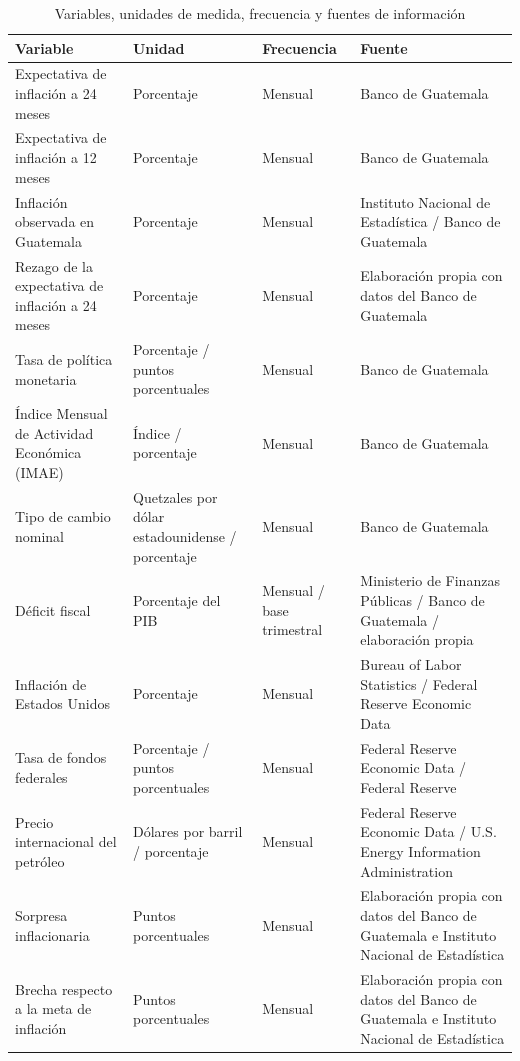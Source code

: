 \documentclass[
  10.5pt,
  letterpaper,
  twocolumn]{article}
\begin{document}
\clearpage
\onecolumn
\begin{landscape}
\thispagestyle{empty}

\begin{table}
\centering
\caption{\label{tab:unnamed-chunk-1}Variables, unidades de medida, frecuencia y fuentes de información}
\centering
\fontsize{9}{11}\selectfont
\begin{threeparttable}
\begin{tabular}[t]{>{\raggedright\arraybackslash}p{7.5cm}>{\raggedright\arraybackslash}p{4.5cm}>{\raggedright\arraybackslash}p{3.5cm}>{\raggedright\arraybackslash}p{8.5cm}}
\toprule
Variable & Unidad & Frecuencia & Fuente\\
\midrule
Expectativa de inflación a 24 meses & Porcentaje & Mensual & Banco de Guatemala\\
Expectativa de inflación a 12 meses & Porcentaje & Mensual & Banco de Guatemala\\
Inflación observada en Guatemala & Porcentaje & Mensual & Instituto Nacional de Estadística / Banco de Guatemala\\
Rezago de la expectativa de inflación a 24 meses & Porcentaje & Mensual & Elaboración propia con datos del Banco de Guatemala\\
Tasa de política monetaria & Porcentaje / puntos porcentuales & Mensual & Banco de Guatemala\\
Índice Mensual de Actividad Económica (IMAE) & Índice / porcentaje & Mensual & Banco de Guatemala\\
Tipo de cambio nominal & Quetzales por dólar estadounidense / porcentaje & Mensual & Banco de Guatemala\\
Déficit fiscal & Porcentaje del PIB & Mensual / base trimestral & Ministerio de Finanzas Públicas / Banco de Guatemala / elaboración propia\\
Inflación de Estados Unidos & Porcentaje & Mensual & Bureau of Labor Statistics / Federal Reserve Economic Data\\
Tasa de fondos federales & Porcentaje / puntos porcentuales & Mensual & Federal Reserve Economic Data / Federal Reserve\\
Precio internacional del petróleo & Dólares por barril / porcentaje & Mensual & Federal Reserve Economic Data / U.S. Energy Information Administration\\
Sorpresa inflacionaria & Puntos porcentuales & Mensual & Elaboración propia con datos del Banco de Guatemala e Instituto Nacional de Estadística\\
Brecha respecto a la meta de inflación & Puntos porcentuales & Mensual & Elaboración propia con datos del Banco de Guatemala e Instituto Nacional de Estadística\\

\end{tabular}
\end{threeparttable}
\end{table}
\end{landscape}
\end{document}
